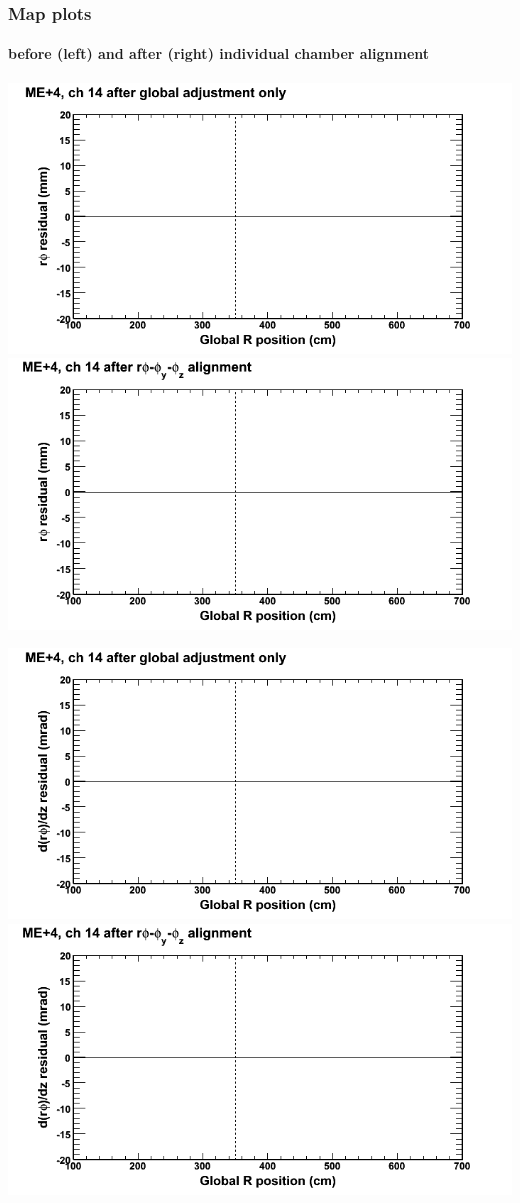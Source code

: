 \documentclass[compress]{beamer}
\begin{document}
\begin{frame}
\frametitle{Map plots}
\framesubtitle{before (left) and after (right) individual chamber alignment}
\includegraphics[width=0.5\linewidth]{ringmapplots_3dof/before_CSCvsr_mep4ch14_x.png} \includegraphics[width=0.5\linewidth]{ringmapplots_3dof/after_CSCvsr_mep4ch14_x.png}

\includegraphics[width=0.5\linewidth]{ringmapplots_3dof/before_CSCvsr_mep4ch14_dxdz.png} \includegraphics[width=0.5\linewidth]{ringmapplots_3dof/after_CSCvsr_mep4ch14_dxdz.png}
\end{frame}
\end{document}
